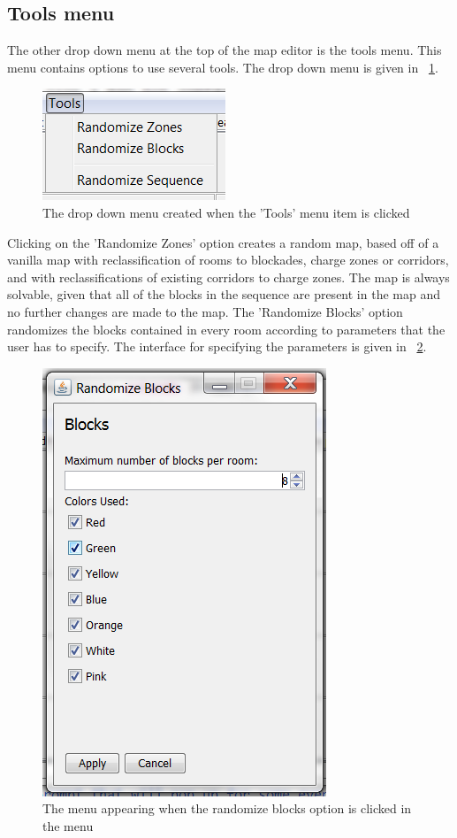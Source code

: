 \subsection{Tools menu}
The other drop down menu at the top of the map editor is the tools menu. This menu contains options to use several tools. The drop down menu is given in ~\ref{fig:dropTools}.
\begin{figure}[h]
	\includegraphics{NewFeatures/DropDownTools.png}
\caption{The drop down menu created when the 'Tools' menu item is clicked}
\label{fig:dropTools}
\end{figure}
Clicking on the 'Randomize Zones' option creates a random map, based off of a vanilla map with reclassification of rooms to blockades, charge zones or corridors, and with reclassifications of existing corridors to charge zones. The map is always solvable, given that all of the blocks in the sequence are present in the map and no further changes are made to the map. The 'Randomize Blocks' option randomizes the blocks contained in every room according to parameters that the user has to specify. The interface for specifying the parameters is given in ~\ref{fig:menuBlocks}.
\begin{figure}[h]
	\includegraphics[scale=0.6]{NewFeatures/MenuBlocks.png}
\caption{The menu appearing when the randomize blocks option is clicked in the menu}
\label{fig:menuBlocks}
\end{figure}

